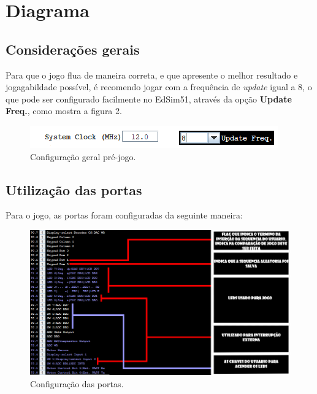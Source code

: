 \documentclass{article}
\begin{document}
\section{Diagrama}
\subsection{Considerações gerais}
Para que o jogo flua de maneira correta, e que apresente o melhor resultado e jogagabildade possível, é recomendo jogar com a frequência de \textit{update} igual a 8, o que pode ser configurado facilmente no EdSim51, através da opção \textbf{Update Freq.}, como mostra a figura 2.
\begin{figure}[H]
\includegraphics[scale=1]{freq.PNG}
\caption{Configuração geral pré-jogo.}
\end{figure}

\subsection{Utilização das portas}
Para o jogo, as portas foram configuradas da seguinte maneira:
\begin{figure}[H]
\hspace*{-1.5in}
\includegraphics[scale=0.6]{TELA_DAS_FLAGS.png}
\caption{Configuração das portas.}

\end{figure}
\end{document}

